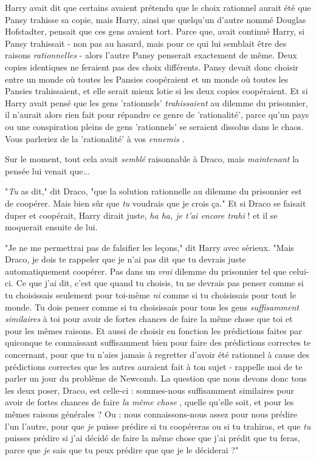 Harry avait dit que certains avaient prétendu que le choix rationnel aurait été que Pansy trahisse sa copie, mais Harry, ainsi que quelqu'un d'autre nommé Douglas Hofstadter, pensait que ces gens avaient tort. Parce que, avait continué Harry, si Pansy trahissait - non pas au hasard, mais pour ce qui lui semblait être des raisons \emph{rationnelles}  - alors l'autre Pansy penserait exactement de même. Deux copies identiques ne feraient pas des choix différents. Pansy devait donc choisir entre un monde où toutes les Pansies coopéraient et un monde où toutes les Pansies trahissaient, et elle serait mieux lotie si les deux copies coopéraient. Et si Harry avait pensé que les gens 'rationnels' \emph{trahissaient}  au dilemme du prisonnier, il n'aurait alors rien fait pour répandre ce genre de 'rationalité', parce qu'un pays ou une conspiration pleins de gens 'rationnels' se seraient dissolus dans le chaos. Vous parleriez de la 'rationalité' à vos \emph{ennemis} .

Sur le moment, tout cela avait \emph{semblé}  raisonnable à Draco, mais \emph{maintenant}  la pensée lui venait que...

"\emph{Tu}  as dit," dit Draco, "que la solution rationnelle au dilemme du prisonnier est de coopérer. Mais bien sûr que \emph{tu}  voudrais que je crois ça." Et si Draco se faisait duper et coopérait, Harry dirait juste, \emph{ha ha, je t'ai encore trahi}  ! et il se moquerait ensuite de lui.

"Je ne me permettrai pas de falsifier les leçons," dit Harry avec sérieux. "Mais Draco, je dois te rappeler que je n'ai pas dit que tu devrais juste automatiquement coopérer. Pas dans un \emph{vrai}  dilemme du prisonnier tel que celui-ci. Ce que j'ai dit, c'est que quand tu choisis, tu ne devrais pas penser comme si tu choisissais seulement pour toi-même \emph{ni}  comme si tu choisissais pour tout le monde. Tu dois penser comme si tu choisissais pour tous les gens \emph{suffisamment similaires } à toi pour avoir de fortes chances de faire la même chose que toi et pour les mêmes raisons. Et aussi de choisir en fonction les prédictions faites par quiconque te connaissant suffisamment bien pour faire des prédictions correctes te concernant, pour que tu n'aies jamais à regretter d'avoir été rationnel à cause des prédictions correctes que les autres auraient fait à ton sujet - rappelle moi de te parler un jour du problème de Newcomb. La question que nous devons donc tous les deux poser, Draco, est celle-ci : sommes-nous suffisamment similaires pour avoir de fortes chances de faire \emph{la même chose} , quelle qu'elle soit, et pour les mêmes raisons générales ? Ou : nous connaissons-nous assez pour nous prédire l'un l'autre, pour que \emph{je}  puisse prédire si tu coopéreras ou si tu trahiras, et que \emph{tu}  puisses prédire si j'ai décidé de faire la même chose que j'ai prédit que tu feras, parce que \emph{je}  sais que tu peux prédire que que je le déciderai ?"

